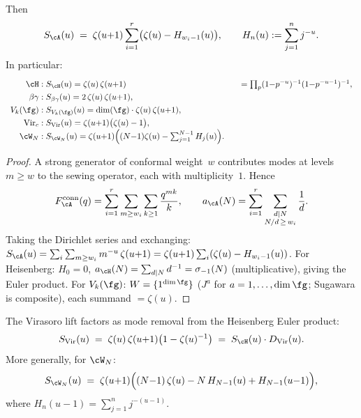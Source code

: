 \begin{theorem}[\ClaimStatusProvedHere]%
\label{thm:dirichlet-weight-formula}%
%
Then
\begin{equation}\label{eq:dirichlet-weight-formula}
S_\cA(u)
\;=\;
\zeta(u{+}1)
\sum_{i=1}^r
\bigl(\zeta(u) - H_{w_i - 1}(u)\bigr),
\qquad
H_n(u) := \sum_{j=1}^n j^{-u}.
\end{equation}
In particular:
\begin{equation}\label{eq:dirichlet-standard}
\renewcommand{\arraystretch}{1.3}
\begin{array}{r@{\;:\;}l@{\qquad}l}
\cH & S_\cH(u) = \zeta(u)\,\zeta(u{+}1)
 & = \prod_p (1{-}p^{-u})^{-1}(1{-}p^{-u-1})^{-1},
\\
\beta\gamma & S_{\beta\gamma}(u) = 2\,\zeta(u)\,\zeta(u{+}1),
\\
V_k(\fg) & S_{V_k(\fg)}(u) = \dim(\fg)\cdot\zeta(u)\,\zeta(u{+}1),
\\
\mathrm{Vir}_c & S_{\mathrm{Vir}}(u) = \zeta(u{+}1)\bigl(\zeta(u) - 1\bigr),
\\
\cW_N & S_{\cW_N}(u)
 = \zeta(u{+}1)\Bigl((N{-}1)\zeta(u) -
 \sum_{j=1}^{N-1} H_j(u)\Bigr).
\end{array}
\end{equation}
\end{theorem}

\begin{proof}
A strong generator of conformal weight~$w$ contributes
modes at levels $m \geq w$ to the sewing operator,
each with multiplicity~$1$. Hence
\[
F_\cA^{\mathrm{conn}}(q)
= \sum_{i=1}^r \sum_{m \geq w_i}\sum_{k \geq 1}
 \frac{q^{mk}}{k},
\qquad
a_\cA(N) = \sum_{i=1}^r
 \sum_{\substack{d \mid N \\ N/d \,\geq\, w_i}}
 \frac{1}{d}.
\]
Taking the Dirichlet series and exchanging:
$S_\cA(u) = \sum_i \sum_{m \geq w_i} m^{-u}\,\zeta(u{+}1)
= \zeta(u{+}1)\sum_i(\zeta(u) - H_{w_i-1}(u))$.
For Heisenberg: $H_0 = 0$,
$a_\cH(N) = \sum_{d \mid N} d^{-1} = \sigma_{-1}(N)$
(multiplicative), giving the Euler product.
For $V_k(\fg)$: $W = \{1^{\dim\fg}\}$
($J^a$ for $a = 1,\ldots,\dim\fg$;
Sugawara is composite), each summand $= \zeta(u)$.
\end{proof}

\begin{corollary}[\ClaimStatusProvedHere]%
\label{cor:virasoro-mode-removal}%
%
%
The Virasoro lift factors as mode removal from the
Heisenberg Euler product:
\begin{equation}\label{eq:virasoro-mode-removal}
S_{\mathrm{Vir}}(u)
\;=\;
\zeta(u)\,\zeta(u{+}1)
\bigl(1 - \zeta(u)^{-1}\bigr)
\;=\;
S_\cH(u)\cdot D_{\mathrm{Vir}}(u).
\end{equation}
More generally, for $\cW_N$:
\begin{equation}\label{eq:wn-alternative}
S_{\cW_N}(u)
\;=\;
\zeta(u{+}1)
\Bigl(
(N{-}1)\,\zeta(u)
- N\,H_{N-1}(u)
+ H_{N-1}(u{-}1)
\Bigr),
\end{equation}
where $H_n(u{-}1) = \sum_{j=1}^n j^{-(u-1)}$.
\end{corollary}

